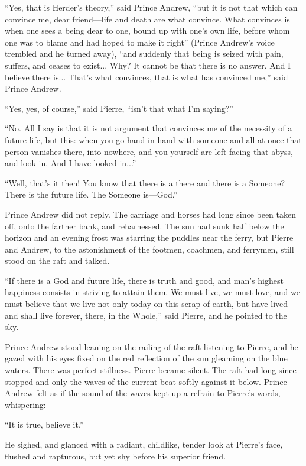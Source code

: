 ``Yes, that is Herder's theory,'' said Prince Andrew, ``but it is
not that which can convince me, dear friend---life and death are
what convince.  What convinces is when one sees a being dear to
one, bound up with one's own life, before whom one was to blame
and had hoped to make it right'' (Prince Andrew's voice trembled
and he turned away), ``and suddenly that being is seized with
pain, suffers, and ceases to exist... Why? It cannot be that
there is no answer. And I believe there is... That's what
convinces, that is what has convinced me,'' said Prince Andrew.

``Yes, yes, of course,'' said Pierre, ``isn't that what I'm
saying?''

``No. All I say is that it is not argument that convinces me of
the necessity of a future life, but this: when you go hand in
hand with someone and all at once that person vanishes there,
into nowhere, and you yourself are left facing that abyss, and
look in. And I have looked in...''

``Well, that's it then! You know that there is a there and there
is a Someone? There is the future life. The Someone is---God.''

Prince Andrew did not reply. The carriage and horses had long
since been taken off, onto the farther bank, and reharnessed. The
sun had sunk half below the horizon and an evening frost was
starring the puddles near the ferry, but Pierre and Andrew, to
the astonishment of the footmen, coachmen, and ferrymen, still
stood on the raft and talked.

``If there is a God and future life, there is truth and good, and
man's highest happiness consists in striving to attain them. We
must live, we must love, and we must believe that we live not
only today on this scrap of earth, but have lived and shall live
forever, there, in the Whole,'' said Pierre, and he pointed to
the sky.

Prince Andrew stood leaning on the railing of the raft listening
to Pierre, and he gazed with his eyes fixed on the red reflection
of the sun gleaming on the blue waters. There was perfect
stillness. Pierre became silent. The raft had long since stopped
and only the waves of the current beat softly against it
below. Prince Andrew felt as if the sound of the waves kept up a
refrain to Pierre's words, whispering:

``It is true, believe it.''

He sighed, and glanced with a radiant, childlike, tender look at
Pierre's face, flushed and rapturous, but yet shy before his
superior friend.

